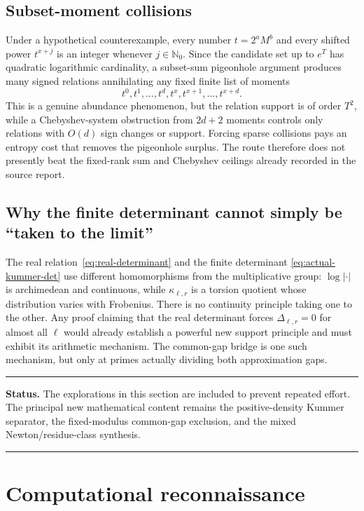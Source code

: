 \documentclass[11pt,oneside]{article}
\theoremstyle{definition}
\theoremstyle{remark}
\newcommand{\Nzero}{\mathbb N_0}
\newenvironment{statusbox}[1]
{\begin{center}\begin{minipage}{0.94\textwidth}\hrule\vspace{0.45em}\textbf{Status.} #1\par\vspace{0.35em}}
{\vspace{0.35em}\hrule\end{minipage}\end{center}}
\begin{document}
\subsection{Subset-moment collisions}

Under a hypothetical counterexample, every number $t=2^aM^b$ and every shifted power
$t^{x+j}$ is an integer whenever $j\in\Nzero$.  Since the candidate set up to $e^T$ has
quadratic logarithmic cardinality, a subset-sum pigeonhole argument produces many signed
relations annihilating any fixed finite list of moments
\[
 t^0,t^1,\ldots,t^d,t^x,t^{x+1},\ldots,t^{x+d}.
\]
This is a genuine abundance phenomenon, but the relation support is of order $T^2$, while a
Chebyshev-system obstruction from $2d+2$ moments controls only relations with $O(d)$ sign
changes or support.  Forcing sparse collisions pays an entropy cost that removes the
pigeonhole surplus.  The route therefore does not presently beat the fixed-rank sum and
Chebyshev ceilings already recorded in the source report.

\subsection{Why the finite determinant cannot simply be ``taken to the limit''}

The real relation~\eqref{eq:real-determinant} and the finite determinant
\eqref{eq:actual-kummer-det} use different homomorphisms from the multiplicative group:
$\log|\cdot|$ is archimedean and continuous, while $\kappa_{\ell,r}$ is a torsion quotient
whose distribution varies with Frobenius.  There is no continuity principle taking one to
the other.  Any proof claiming that the real determinant forces
$\Delta_{\ell,r}=0$ for almost all $\ell$ would already establish a powerful new support
principle and must exhibit its arithmetic mechanism.  The common-gap bridge is one such
mechanism, but only at primes actually dividing both approximation gaps.

\begin{statusbox}{The explorations in this section are included to prevent repeated effort.
The principal new mathematical content remains the positive-density Kummer separator, the
fixed-modulus common-gap exclusion, and the mixed Newton/residue-class synthesis.}
\end{statusbox}

\section{Computational reconnaissance}
\label{sec:computations}
\end{document}
